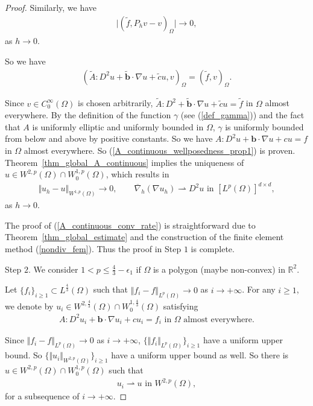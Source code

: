 \documentclass[12pt]{amsart}
\theoremstyle{definition}
\theoremstyle{remark}
\begin{document}
\begin{proof}
Similarly, we have 
\begin{align*}
\vert (\tilde{f}, P_{h}v - v)_{\Omega} \vert \rightarrow 0,
\end{align*}
as $h \rightarrow 0$.

So we have 
\begin{align*}
(\tilde{A}:D^{2}u + \tilde{\boldsymbol{b}}\cdot\nabla u 
+ \tilde{c}u, v)_{\Omega} = (\tilde{f}, v)_{\Omega}. 
\end{align*}

Since $v \in C_{0}^{\infty}(\Omega)$ is chosen arbitrarily, 
$\tilde{A}:D^{2}+\tilde{\boldsymbol{b}}\cdot\nabla u 
+ \tilde{c}u = \tilde{f}$ in $\Omega$ almost everywhere. 
By the definition of the function $\gamma$ (see (\ref{def_gamma})) and 
the fact that $A$ is uniformly elliptic and uniformly bounded in $\Omega$,  
$\gamma$ is uniformly bounded from below and above by positive constants. 
So we have $A:D^{2}u +\boldsymbol{b}\cdot\nabla u + cu = f$ in $\Omega$ 
almost everywhere. 
So (\ref{A_continuous_wellposedness_prop1}) 
is proven. Theorem~\ref{thm_global_A_continuous} implies the uniqueness of 
$u \in W^{2,p}(\Omega) \cap W_{0}^{1,p}(\Omega)$, which results in 
\begin{align*}
\Vert u_{h} - u\Vert_{W^{1,p}(\Omega)} \rightarrow 0, \qquad 
\overline{\nabla}_{h}(\nabla u_{h}) \rightharpoonup D^{2}u 
\text{ in } [L^{p}(\Omega)]^{d \times d},
\end{align*}
as $h \rightarrow 0$. 

The proof of (\ref{A_continuous_conv_rate}) is straightforward due to 
Theorem~\ref{thm_global_estimate} and the construction of the finite element method (\ref{nondiv_fem}).
Thus the proof in Step $1$ is complete.

Step $2$. We consider $1< p \leq \frac{4}{3} - \epsilon_{1}$ if $\Omega$ is a 
polygon (maybe non-convex) in $\mathbb{R}^{2}$. 

Let $\{{f_{i}}\}_{i \geq 1} \subset L^{\frac{4}{3}}(\Omega)$ such that 
$\Vert f_{i} -f \Vert_{L^{p}(\Omega)} \rightarrow 0$ as $i \rightarrow +\infty$. 
For any $i \geq 1$, we denote by $u_{i} \in W^{2,\frac{4}{3}}(\Omega) \cap 
W_{0}^{1, \frac{4}{3}}(\Omega)$ satisfying 
\begin{align*}
A:D^{2} u_{i} + \boldsymbol{b}\cdot \nabla u_{i} + c u_{i} = f_{i} 
\text{ in } \Omega \text{ almost everywhere}.
\end{align*}

Since $\Vert f_{i} -f \Vert_{L^{p}(\Omega)} \rightarrow 0$ as $i \rightarrow +\infty$, 
$\{ \Vert f_{i} \Vert_{L^{p}(\Omega)} \}_{i \geq 1}$ have a uniform upper bound. 
So $\{ \Vert u_{i}\Vert_{W^{2,p}(\Omega)} \}_{i \geq 1}$ have a uniform upper bound 
as well. So there is $u \in W^{2,p}(\Omega) \cap W_{0}^{1,p}(\Omega)$ such that 
\begin{align*}
u_{i} \rightharpoonup u \text{ in } W^{2,p}(\Omega),
\end{align*}
for a subsequence of $i \rightarrow + \infty$.


\end{proof}
\end{document}
